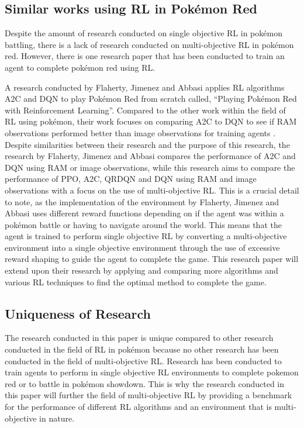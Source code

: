 \subsection{Similar works using RL in Pokémon Red}

Despite the amount of research conducted on single objective RL in pokémon battling, there is a lack of research conducted on multi-objective RL in pokémon red. However, there is one research paper that has been conducted to train an agent to complete pokémon red using RL.

A research conducted by Flaherty, Jimenez and Abbasi applies RL algorithms A2C and DQN to play Pokémon Red from scratch called, ``Playing Pokémon Red with Reinforcement Learning''\cite{flaherty2021playing}. Compared to the other work within the field of RL using pokémon, their work focuses on comparing A2C to DQN to see if RAM observations performed better than image observations for training agents \cite{flaherty2021playing}. Despite similarities between their research and the purpose of this research, the research by Flaherty, Jimenez and Abbasi compares the performance of A2C and DQN using RAM or image observations, while this research aims to compare the performance of PPO, A2C, QRDQN and DQN using RAM and image observations with a focus on the use of multi-objective RL. This is a crucial detail to note, as the implementation of the environment by Flaherty, Jimenez and Abbasi uses different reward functions depending on if the agent was within a pokémon battle or having to navigate around the world. This means that the agent is trained to perform single objective RL by converting a multi-objective environment into a single objective environment through the use of excessive reward shaping to guide the agent to complete the game. This research paper will extend upon their research by applying and comparing more algorithms and various RL techniques to find the optimal method to complete the game.

\subsection{Uniqueness of Research}

The research conducted in this paper is unique compared to other research conducted in the field of RL in pokémon because no other research has been conducted in the field of multi-objective RL. Research has been conducted to train agents to perform in single objective RL environments to complete pokemon red or to battle in pokémon showdown. This is why the research conducted in this paper will further the field of multi-objective RL by providing a benchmark for the performance of different RL algorithms and an environment that is multi-objective in nature.